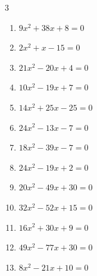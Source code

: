 \begin{multicols}{3}
\begin{enumerate}
  \item $9x^{2}+38x+8=0$


  \item $2x^{2}+x-15=0$


  \item $21x^{2}-20x+4=0$


  \item $10x^{2}-19x+7=0$


\columnbreak %

  \item $14x^{2}+25x-25=0$


  \item $24x^{2}-13x-7=0$


  \item $18x^{2}-39x-7=0$


  \item $24x^{2}-19x+2=0$


  \item $20x^{2}-49x+30=0$


  \item $32x^{2}-52x+15=0$


  \item $16x^{2}+30x+9=0$


  \item $49x^{2}-77x+30=0$


  \item $8x^{2}-21x+10=0$


\end{enumerate}
\end{multicols}
